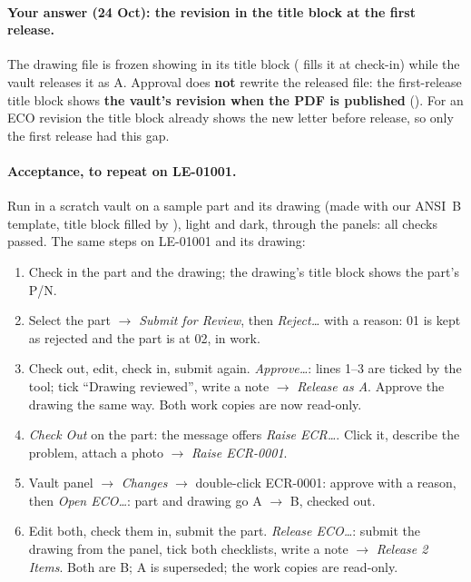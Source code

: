 \paragraph{Your answer (24 Oct): the revision in the title block at the first release.} The drawing file is frozen
showing  in its title block ( fills it at check-in) while the vault releases it as A. Approval
does \textbf{not} rewrite the released file: the first-release title block shows \textbf{the vault's revision when the
PDF is published} (). For an ECO revision the title block already shows the new letter before release, so
only the first release had this gap.

\paragraph{Acceptance, to repeat on LE-01001.} Run in a scratch vault on a sample part and its drawing (made with our
ANSI~B template, title block filled by ), light and dark, through the panels: all checks passed. The same
steps on LE-01001 and its drawing:
\begin{enumerate}[nosep]
  \item Check in the part and the drawing; the drawing's title block shows the part's P/N.
  \item Select the part $\rightarrow$ \emph{Submit for Review}, then \emph{Reject\ldots} with a reason: 01 is kept as
        rejected and the part is at 02, in work.
  \item Check out, edit, check in, submit again. \emph{Approve\ldots}: lines 1--3 are ticked by the tool; tick ``Drawing
        reviewed'', write a note $\rightarrow$ \emph{Release as A}. Approve the drawing the same way. Both work copies are
        now read-only.
  \item \emph{Check Out} on the part: the message offers \emph{Raise ECR\ldots}. Click it, describe the problem, attach a
        photo $\rightarrow$ \emph{Raise ECR-0001}.
  \item Vault panel $\rightarrow$ \emph{Changes} $\rightarrow$ double-click ECR-0001: approve with a reason, then
        \emph{Open ECO\ldots}: part and drawing go A $\rightarrow$ B, checked out.
  \item Edit both, check them in, submit the part. \emph{Release ECO\ldots}: submit the drawing from the panel, tick both
        checklists, write a note $\rightarrow$ \emph{Release 2 Items}. Both are B; A is superseded; the work copies are
        read-only.
\end{enumerate}
